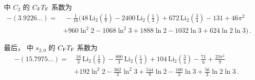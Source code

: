  中 $C_2$ 的 $C_\mathrm{F}T_\mathrm{F}$ 系数为
\begin{equation}
  \begin{split}
    -(3.9226\ldots) = &\ - \frac{1}{18} \bigg(
    48\,\text{Li}_2\left(\frac{1}{9}\right)-2400\,\text{Li}_2
    \left(\frac{1}{3}\right)+672\,\text{Li}_2\left(\frac{3}{4}\right)-131+46
    \pi ^2 \\ &+960 \ln^2 2 -1068 \ln^2 3 +1888 \ln 2-1032\ln 3+624 \ln
    2 \ln 3 \bigg) \,.
    \label{eq:c2cftf}
  \end{split}
\end{equation}

最后， 中 $s_{2,0}$ 的 $C_\mathrm{F}T_\mathrm{F}$ 系数为
\begin{equation}
  \begin{split}
    -(15.7975 \dots) =
    &\ \frac{16}{3} \, \text{Li}_2\left(\frac{1}{9}\right) - \frac{800}{3} \, \text{Li}_2\left(\frac{1}{3}\right) + 104 \, \text{Li}_2\left(\frac{3}{4}\right) -\frac{71}{6}+\frac{23 \pi ^2}{9} \\
    &+ 192 \ln^2 2 - \frac{362}{3} \ln^2 3 +\frac{544}{9} \ln 2-\frac{100}{3} \ln 3 + \frac{56}{3} \ln 2 \ln 3 \,.
    \label{eq:s20cftf}
  \end{split}
\end{equation}

\newcommand{\bibentry}[4]{#1, {\it #2}, #3\ifthenelse{\equal{#4}{}}{}{, }#4.}
\newcommand{\journal}[5]{\href{https://dx.doi.org/#5}{\textit{#1} {\bf #2} (#3) #4}}
\newcommand{\arxiv}[2]{\href{https://arXiv.org/abs/#1}{\texttt{arXiv:#1\,[#2]}}}
\newcommand{\arxivhepph}[1]{\href{https://arXiv.org/abs/hep-ph/#1}{\texttt{hep-ph/#1}}}
\newcommand{\arxivhepth}[1]{\href{https://arXiv.org/abs/hep-th/#1}{\texttt{hep-th/#1}}}
\newcommand{\arxivheplat}[1]{\href{https://arXiv.org/abs/hep-lat/#1}{\texttt{hep-lat/#1}}}
\newcommand{\arxivmathph}[1]{\href{https://arXiv.org/abs/math-ph/#1}{\texttt{math-ph/#1}}}
\newcommand{\arxivmath}[1]{\href{https://arXiv.org/abs/math/#1}{\texttt{arXiv:#1 [math]}}}

